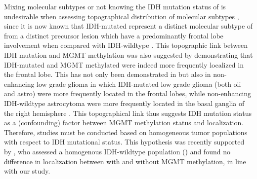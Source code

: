 Mixing molecular subtypes or not knowing the \gls{IDH} mutation status of  is undesirable when assessing topographical distribution of molecular subtypes \autocite{louis20162016}, since it is now known that \gls{IDH}-mutated  represent a distinct molecular subtype of  from a distinct precursor lesion which have a predominantly frontal lobe involvement when compared with \gls{IDH}-wildtype  \autocite{lai2011evidence}.
This topographic link between \gls{IDH} mutation and \gls{MGMT} methylation was also suggested by  demonstrating that \gls{IDH}-mutated and \gls{MGMT} methylated  were indeed more frequently localized in the frontal lobe.
This has not only been demonstrated in  but also in non-enhancing low grade glioma in which \gls{IDH}-mutated low grade glioma (both \gls{oli} and \gls{astro}) were more frequently located in the frontal lobes, while non-enhancing \gls{IDH}-wildtype astrocytoma were more frequently located in the basal ganglia of the right hemisphere \autocite{chaichana2011factors}.
This topographical link thus suggests \gls{IDH} mutation status as a (confounding) factor between \gls{MGMT} methylation status and localization.
Therefore, studies must be conducted based on homogeneous \gls{tumor} populations with respect to \gls{IDH} mutational status.
This hypothesis was recently supported by , who assessed a homogenous \gls{IDH}-wildtype  population () and found no difference in localization between  with and without \gls{MGMT} methylation, in line with our study.

